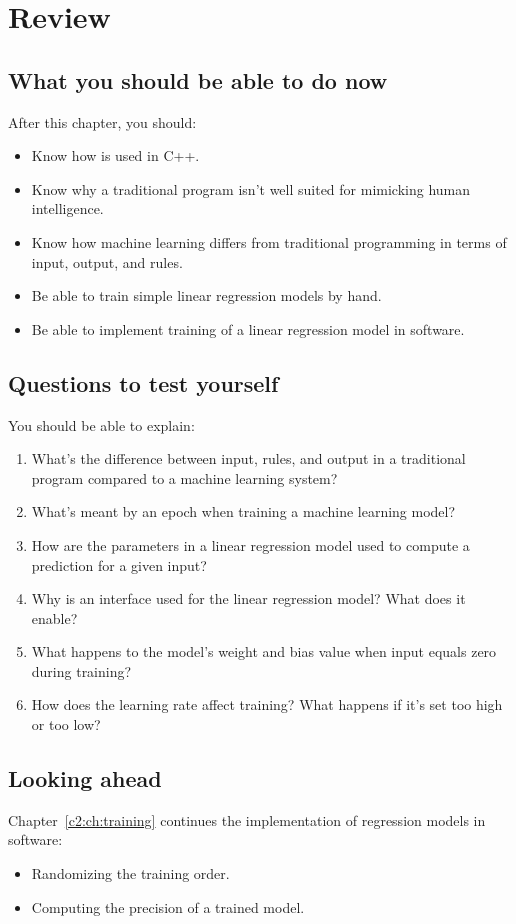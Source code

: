 
\section{Review}
\label{c1:sec:review}

\subsection*{What you should be able to do now}
After this chapter, you should:
\begin{itemize}
  \item Know how  is used in C++.
  \item Know why a traditional program isn't well suited for mimicking human intelligence.
  \item Know how machine learning differs from traditional programming in terms of input, output,
    and rules.
  \item Be able to train simple linear regression models by hand.
  \item Be able to implement training of a linear regression model in software.
\end{itemize}

\subsection*{Questions to test yourself}
You should be able to explain:
\begin{enumerate}
  \item What's the difference between input, rules, and output in a traditional program compared
    to a machine learning system?
  \item What's meant by an epoch when training a machine learning model?
  \item How are the parameters in a linear regression model used to compute a prediction for a
    given input?
  \item Why is an interface used for the linear regression model? What does it enable?
  \item What happens to the model's weight and bias value when input  equals zero during
    training?
  \item How does the learning rate affect training? What happens if it's set too high or too low?
\end{enumerate}

\subsection*{Looking ahead}
Chapter~\ref{c2:ch:training} continues the implementation of regression models in software:
\begin{itemize}
  \item Randomizing the training order.
  \item Computing the precision of a trained model.
\end{itemize}
